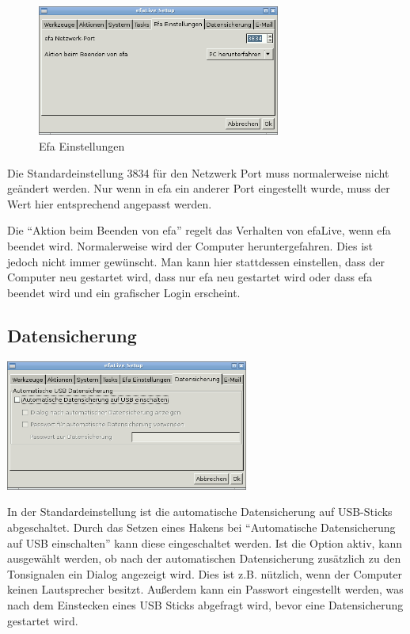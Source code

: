 \documentclass[a4paper,12pt,twoside]{article}
\begin{document}
\begin{figure}
    \centering
    \captionsetup{type=figure}
    \includegraphics[width=8cm]{screenshots/efalive_setup_efa-settings.png}
    \caption{Efa Einstellungen}
    \label{fig:efalivesetup_efasettings}
\end{figure}

Die Standardeinstellung 3834 für den Netzwerk Port muss normalerweise nicht 
geändert werden. Nur wenn in efa ein
anderer Port eingestellt wurde, muss der Wert hier entsprechend
angepasst werden.

Die "`Aktion beim Beenden von efa"' regelt das
Verhalten von efaLive, wenn efa beendet wird. Normalerweise wird der
Computer heruntergefahren. Dies ist jedoch nicht immer gewünscht. Man
kann hier stattdessen einstellen, dass der Computer neu gestartet wird, 
dass nur efa neu gestartet wird oder dass efa beendet wird und ein 
grafischer Login erscheint.


\subsection{Datensicherung}
\label{sct:efalivesetup_backup}

\bigskip
\begin{minipage}{\linewidth}
    \centering
    \captionsetup{type=figure}
    \includegraphics[width=8cm]{screenshots/efalive_setup_backup.png}
    \label{fig:efalivesetup_backup}
\end{minipage}
\bigskip

In der Standardeinstellung ist die automatische Datensicherung auf
USB-Sticks abgeschaltet. Durch das Setzen eines Hakens bei
"`Automatische Datensicherung auf USB
einschalten"' kann diese eingeschaltet werden. Ist die
Option aktiv, kann ausgewählt werden, ob nach der automatischen
Datensicherung zusätzlich zu den Tonsignalen ein Dialog angezeigt wird.
Dies ist z.B. nützlich, wenn der Computer keinen Lautsprecher besitzt. 
Außerdem kann ein Passwort eingestellt werden, was nach dem Einstecken
eines USB Sticks abgefragt wird, bevor eine Datensicherung gestartet wird.
\end{document}
